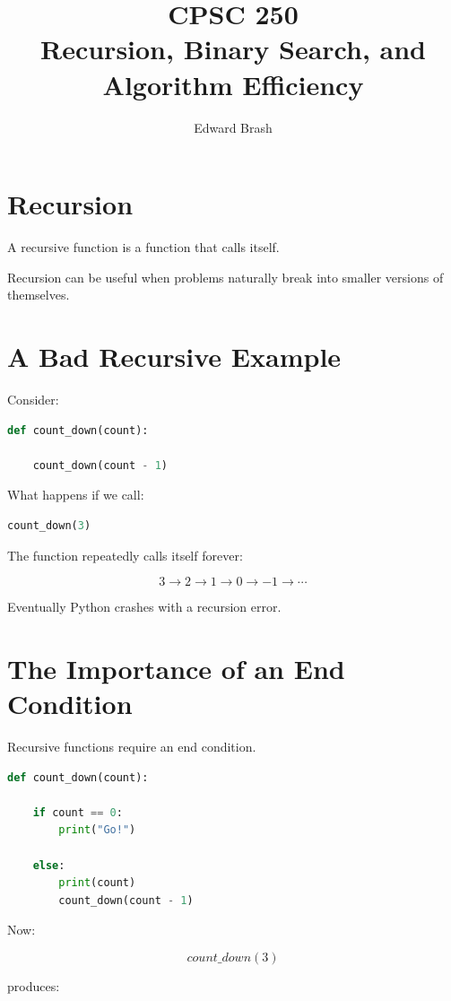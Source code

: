 \documentclass[11pt]{article}
\title{CPSC 250 \\ Recursion, Binary Search, and Algorithm Efficiency}
\author{Edward Brash}
\date{}
\begin{document}
\maketitle

\section{Recursion}

A recursive function is a function that calls itself.

Recursion can be useful when problems naturally break into smaller versions of themselves.

\section{A Bad Recursive Example}

Consider:

\begin{lstlisting}[language=Python]
def count_down(count):

    count_down(count - 1)
\end{lstlisting}

What happens if we call:

\begin{lstlisting}[language=Python]
count_down(3)
\end{lstlisting}

The function repeatedly calls itself forever:

\[
3 \rightarrow 2 \rightarrow 1 \rightarrow 0 \rightarrow -1 \rightarrow \cdots
\]

Eventually Python crashes with a recursion error.

\section{The Importance of an End Condition}

Recursive functions require an end condition.

\begin{lstlisting}[language=Python]
def count_down(count):

    if count == 0:
        print("Go!")

    else:
        print(count)
        count_down(count - 1)
\end{lstlisting}

Now:

\[
count\_down(3)
\]

produces:
\end{document}
